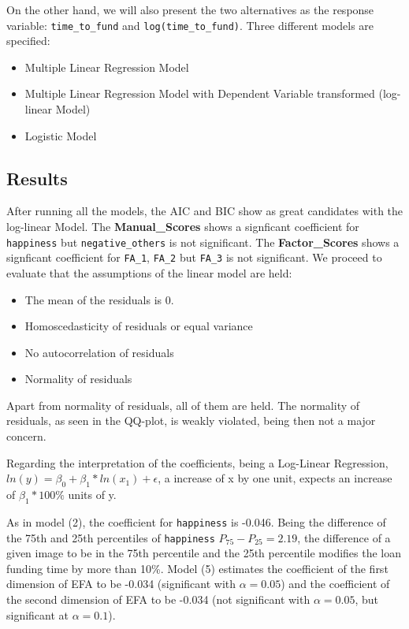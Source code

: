 On the other hand, we will also present the two alternatives as the response variable: \texttt{time\_to\_fund} and \texttt{log(time\_to\_fund)}.
Three different models are specified:
\begin{itemize}
\item Multiple Linear Regression Model
\item Multiple Linear Regression Model with Dependent Variable transformed (log-linear Model)
\item Logistic Model
\end{itemize}

\subsection{Results}
After running all the models, the AIC and BIC show as great candidates with the log-linear Model. The \textbf{Manual\_Scores} shows a signficant coefficient for \texttt{happiness} but \texttt{negative\_others} is not significant. The \textbf{Factor\_Scores} shows a signficant coefficient for \texttt{FA\_1}, \texttt{FA\_2} but \texttt{FA\_3} is not significant.
We proceed to evaluate that the assumptions of the linear model are held:
\begin{itemize} 
\item The mean of the residuals is 0.
\item Homoscedasticity of residuals or equal variance
\item No autocorrelation of residuals
\item Normality of residuals
\end{itemize}
Apart from normality of residuals, all of them are held. The normality of residuals, as seen in the QQ-plot, is weakly violated, being then not a major concern.

Regarding the interpretation of the coefficients, being a Log-Linear Regression, $ln(y) = \beta_0 + \beta_1 * ln(x_1) + \epsilon$, a increase of x by one unit, expects an increase of ${\beta_1}*{100}\%$ units of y. \par
As in model (2), the coefficient for \texttt{happiness} is -0.046. Being the difference of the 75th and 25th percentiles of \texttt{happiness} $P_{75}-P_{25}=2.19$, the difference of a given image to be in the 75th percentile and the 25th percentile modifies the loan funding time by more than 10\%.
Model (5) estimates the coefficient of the first dimension of EFA to be -0.034 (significant with $\alpha=0.05$) and the coefficient of the second dimension of EFA to be -0.034 (not significant with $\alpha=0.05$, but significant at $\alpha=0.1$). 
